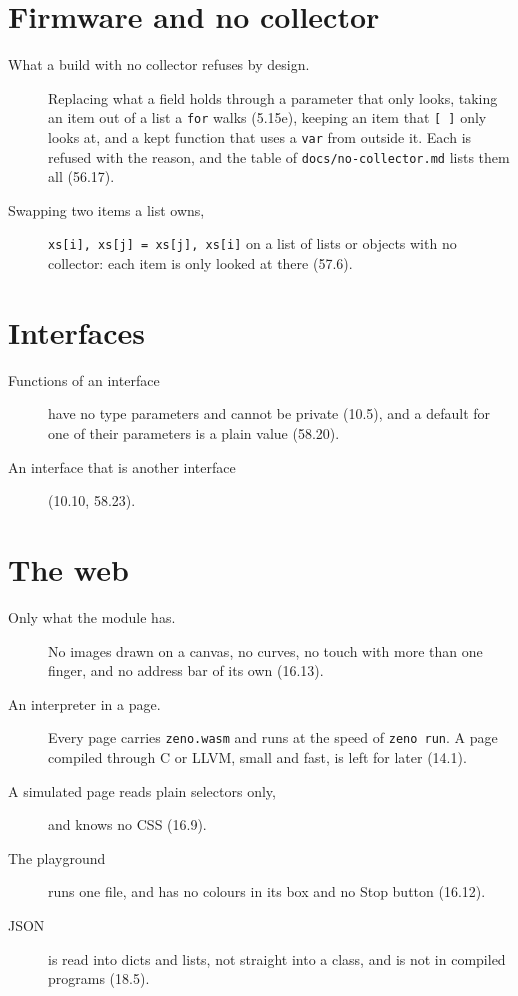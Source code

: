 \section{Firmware and no collector}

\begin{description}
\item[What a build with no collector refuses by design.] Replacing
  what a field holds through a parameter that only looks, taking an
  item out of a list a \verb|for| walks (5.15e), keeping an item that
  \verb|[ ]| only looks at, and a kept function that uses a \verb|var|
  from outside it. Each is refused with the reason, and the table of
  \verb|docs/no-collector.md| lists them all (56.17).
\item[Swapping two items a list owns,] \verb|xs[i], xs[j] = xs[j], xs[i]|
  on a list of lists or objects with no collector: each item is only
  looked at there (57.6).
\end{description}

\section{Interfaces}

\begin{description}
\item[Functions of an interface] have no type parameters and cannot
  be private (10.5), and a default for one of their parameters is a
  plain value (58.20).
\item[An interface that is another interface] (10.10, 58.23).
\end{description}

\section{The web}

\begin{description}
\item[Only what the module has.] No images drawn on a canvas, no
  curves, no touch with more than one finger, and no address bar of
  its own (16.13).
\item[An interpreter in a page.] Every page carries \verb|zeno.wasm|
  and runs at the speed of \verb|zeno run|. A page compiled through C
  or LLVM, small and fast, is left for later (14.1).
\item[A simulated page reads plain selectors only,] and knows no CSS
  (16.9).
\item[The playground] runs one file, and has no colours in its box and
  no Stop button (16.12).
\item[JSON] is read into dicts and lists, not straight into a class,
  and is not in compiled programs (18.5).
\end{description}


